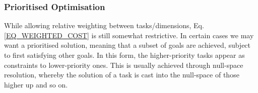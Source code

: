 \documentclass[12pt,a4paper,onecolumn]{article}
\begin{document}
\subsubsection*{Prioritised Optimisation}
While allowing relative weighting between tasks/dimensions, Eq.\ref{EQ_WEIGHTED_COST} is still somewhat restrictive. In certain cases we may want a prioritised solution, meaning that a subset of goals are achieved, subject to first satisfying other goals. In this form, the higher-priority tasks appear as constraints to lower-priority ones. This is usually achieved through null-space resolution, whereby the solution of a task is cast into the null-space of those higher up and so on.

%
\end{document}
